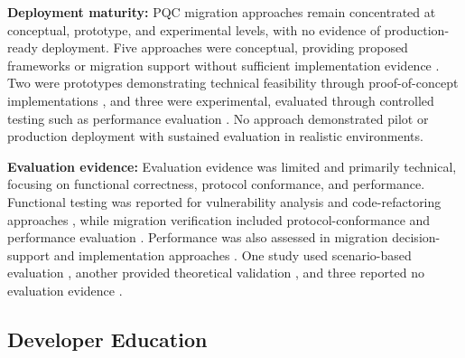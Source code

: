 \documentclass[letterpaper,twocolumn,10pt]{article}
\begin{document}
\textbf{Deployment maturity: } PQC migration approaches remain concentrated at conceptual, prototype, and experimental levels, with no evidence of production-ready deployment. Five approaches were conceptual, providing proposed frameworks or migration support without sufficient implementation evidence \cite{Ana_MigFrDepen, Ana_PMMP, Ana_FinanceMig, Ana_decisionAlgo, Ana_legacyToQuantumConvert}. Two were prototypes demonstrating technical feasibility through proof-of-concept implementations \cite{Ana_MigFrameOrg, Ana_ccPASTpqc}, and three were experimental, evaluated through controlled testing such as performance evaluation \cite{Ana_e27020212, Ana_rattanavipanon_toolchain_2025, Ana_android_Migr}. No approach demonstrated pilot or production deployment with sustained evaluation in realistic environments.

\textbf{Evaluation evidence: } Evaluation evidence was limited and primarily technical, focusing on functional correctness, protocol conformance, and performance. Functional testing was reported for vulnerability analysis and code-refactoring approaches \cite{Ana_rattanavipanon_toolchain_2025, Ana_ccPASTpqc}, while migration verification included protocol-conformance and performance evaluation \cite{Ana_e27020212}. Performance was also assessed in migration decision-support and implementation approaches \cite{Ana_decisionAlgo, Ana_android_Migr}. One study used scenario-based evaluation \cite{Ana_MigFrameOrg}, another provided theoretical validation \cite{Ana_PMMP}, and three reported no evaluation evidence \cite{Ana_MigFrDepen, Ana_FinanceMig, Ana_legacyToQuantumConvert}.

\subsection{Developer Education}
\label{ResEduAp}
\end{document}
